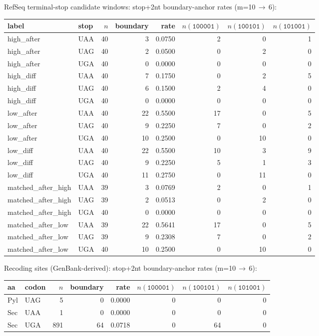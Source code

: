 \noindent RefSeq terminal-stop candidate windows: stop+2nt boundary-anchor rates (m=10\,$\to$\,6):
\begin{center}
\scriptsize
\setlength{\tabcolsep}{6pt}
\renewcommand{\arraystretch}{1.10}
\begin{tabular}{l l r r r r r r}
\toprule
label & stop & $n$ & boundary & rate & $n(\texttt{100001})$ & $n(\texttt{100101})$ & $n(\texttt{101001})$ \\
\midrule
high\_after & UAA & 40 & 3 & 0.0750 & 2 & 0 & 1 \\
high\_after & UAG & 40 & 2 & 0.0500 & 0 & 2 & 0 \\
high\_after & UGA & 40 & 0 & 0.0000 & 0 & 0 & 0 \\
high\_diff & UAA & 40 & 7 & 0.1750 & 0 & 2 & 5 \\
high\_diff & UAG & 40 & 6 & 0.1500 & 2 & 4 & 0 \\
high\_diff & UGA & 40 & 0 & 0.0000 & 0 & 0 & 0 \\
low\_after & UAA & 40 & 22 & 0.5500 & 17 & 0 & 5 \\
low\_after & UAG & 40 & 9 & 0.2250 & 7 & 0 & 2 \\
low\_after & UGA & 40 & 10 & 0.2500 & 0 & 10 & 0 \\
low\_diff & UAA & 40 & 22 & 0.5500 & 10 & 3 & 9 \\
low\_diff & UAG & 40 & 9 & 0.2250 & 5 & 1 & 3 \\
low\_diff & UGA & 40 & 11 & 0.2750 & 0 & 11 & 0 \\
matched\_after\_high & UAA & 39 & 3 & 0.0769 & 2 & 0 & 1 \\
matched\_after\_high & UAG & 39 & 2 & 0.0513 & 0 & 2 & 0 \\
matched\_after\_high & UGA & 40 & 0 & 0.0000 & 0 & 0 & 0 \\
matched\_after\_low & UAA & 39 & 22 & 0.5641 & 17 & 0 & 5 \\
matched\_after\_low & UAG & 39 & 9 & 0.2308 & 7 & 0 & 2 \\
matched\_after\_low & UGA & 40 & 10 & 0.2500 & 0 & 10 & 0 \\
\bottomrule
\end{tabular}
\end{center}

\noindent Recoding sites (GenBank-derived): stop+2nt boundary-anchor rates (m=10\,$\to$\,6):
\begin{center}
\scriptsize
\setlength{\tabcolsep}{6pt}
\renewcommand{\arraystretch}{1.10}
\begin{tabular}{l l r r r r r r}
\toprule
aa & codon & $n$ & boundary & rate & $n(\texttt{100001})$ & $n(\texttt{100101})$ & $n(\texttt{101001})$ \\
\midrule
Pyl & UAG & 5 & 0 & 0.0000 & 0 & 0 & 0 \\
Sec & UAA & 1 & 0 & 0.0000 & 0 & 0 & 0 \\
Sec & UGA & 891 & 64 & 0.0718 & 0 & 64 & 0 \\
\bottomrule
\end{tabular}
\end{center}

